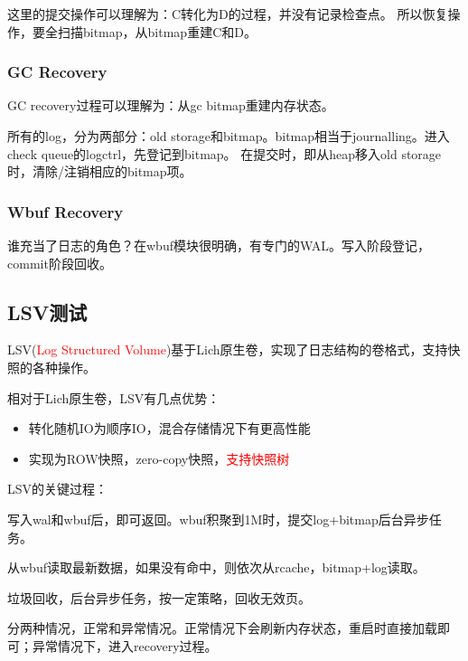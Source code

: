 \documentclass[UTF8]{ctexart}
\begin{document}
这里的提交操作可以理解为：C转化为D的过程，并没有记录检查点。
所以恢复操作，要全扫描bitmap，从bitmap重建C和D。

\subsubsection{GC Recovery}

GC recovery过程可以理解为：从gc bitmap重建内存状态。

所有的log，分为两部分：old storage和bitmap。bitmap相当于journalling。进入check queue的logctrl，先登记到bitmap。
在提交时，即从heap移入old storage时，清除/注销相应的bitmap项。

\subsubsection{Wbuf Recovery}

谁充当了日志的角色？在wbuf模块很明确，有专门的WAL。写入阶段登记，commit阶段回收。

\subsection{LSV测试}

LSV(\textcolor{red}{Log Structured Volume})基于Lich原生卷，实现了日志结构的卷格式，支持快照的各种操作。

相对于Lich原生卷，LSV有几点优势：
\begin{tcolorbox}
    \begin{itemize}
        \item 转化随机IO为顺序IO，混合存储情况下有更高性能
        \item 实现为ROW快照，zero-copy快照，\textcolor{red}{支持快照树}
    \end{itemize}
\end{tcolorbox}

LSV的关键过程：
\begin{tcolorbox}
    \begin{description}[style=nextline]
        \item [写] 写入wal和wbuf后，即可返回。wbuf积聚到1M时，提交log+bitmap后台异步任务。
        \item [读] 从wbuf读取最新数据，如果没有命中，则依次从rcache，bitmap+log读取。
        \item [GC] 垃圾回收，后台异步任务，按一定策略，回收无效页。
        \item [重启] 分两种情况，正常和异常情况。正常情况下会刷新内存状态，重启时直接加载即可；异常情况下，进入recovery过程。
    \end{description}
\end{tcolorbox}
\end{document}
